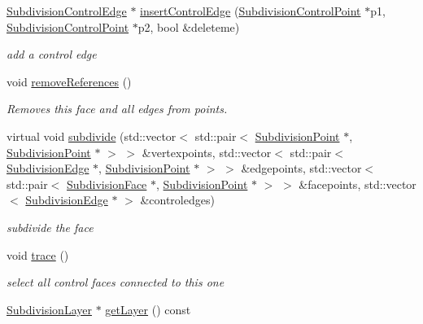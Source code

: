 \begin{DoxyCompactItemize}
\hyperlink{classShipCAD_1_1SubdivisionControlEdge}{Subdivision\+Control\+Edge} $\ast$ \hyperlink{classShipCAD_1_1SubdivisionControlFace_a864eb7e746c2e057542efe14a4bba241}{insert\+Control\+Edge} (\hyperlink{classShipCAD_1_1SubdivisionControlPoint}{Subdivision\+Control\+Point} $\ast$p1, \hyperlink{classShipCAD_1_1SubdivisionControlPoint}{Subdivision\+Control\+Point} $\ast$p2, bool \&deleteme)
\begin{DoxyCompactList}\small\item\em add a control edge \end{DoxyCompactList}\item 
void \hyperlink{classShipCAD_1_1SubdivisionControlFace_a1c5253075cbe1f05ba004bee4edb8698}{remove\+References} ()
\begin{DoxyCompactList}\small\item\em Removes this face and all edges from points. \end{DoxyCompactList}\item 
virtual void \hyperlink{classShipCAD_1_1SubdivisionControlFace_aa17b5bb33ad87a4fa1e618156c171c64}{subdivide} (std\+::vector$<$ std\+::pair$<$ \hyperlink{classShipCAD_1_1SubdivisionPoint}{Subdivision\+Point} $\ast$, \hyperlink{classShipCAD_1_1SubdivisionPoint}{Subdivision\+Point} $\ast$ $>$ $>$ \&vertexpoints, std\+::vector$<$ std\+::pair$<$ \hyperlink{classShipCAD_1_1SubdivisionEdge}{Subdivision\+Edge} $\ast$, \hyperlink{classShipCAD_1_1SubdivisionPoint}{Subdivision\+Point} $\ast$ $>$ $>$ \&edgepoints, std\+::vector$<$ std\+::pair$<$ \hyperlink{classShipCAD_1_1SubdivisionFace}{Subdivision\+Face} $\ast$, \hyperlink{classShipCAD_1_1SubdivisionPoint}{Subdivision\+Point} $\ast$ $>$ $>$ \&facepoints, std\+::vector$<$ \hyperlink{classShipCAD_1_1SubdivisionEdge}{Subdivision\+Edge} $\ast$ $>$ \&controledges)
\begin{DoxyCompactList}\small\item\em subdivide the face \end{DoxyCompactList}\item 
void \hyperlink{classShipCAD_1_1SubdivisionControlFace_a768d000d2891ca110d6eb804abf80351}{trace} ()
\begin{DoxyCompactList}\small\item\em select all control faces connected to this one \end{DoxyCompactList}\item 
\hyperlink{classShipCAD_1_1SubdivisionLayer}{Subdivision\+Layer} $\ast$ \hyperlink{classShipCAD_1_1SubdivisionControlFace_a25e4ea676adc327a430b50a81e91ef9d}{get\+Layer} () const 

\end{DoxyCompactItemize}
